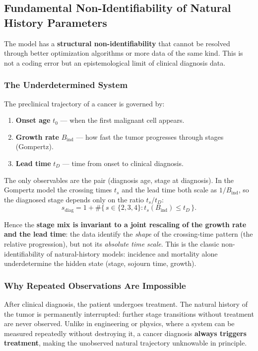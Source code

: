 \documentclass[12pt,a4paper]{article}
\begin{document}
\subsection{Fundamental Non-Identifiability of Natural History Parameters}
\label{sec:ident}

The model has a \textbf{structural non-identifiability} that cannot be resolved through better optimization algorithms or more data of the same kind. This is not a coding error but an epistemological limit of clinical diagnosis data.

\subsubsection{The Underdetermined System}

The preclinical trajectory of a cancer is governed by:
\begin{enumerate}[nosep]
    \item \textbf{Onset age} $t_0$ — when the first malignant cell appears.
    \item \textbf{Growth rate} $B_{\text{ind}}$ — how fast the tumor progresses through stages (Gompertz).
    \item \textbf{Lead time} $t_D$ — time from onset to clinical diagnosis.
\end{enumerate}

The only observables are the pair (diagnosis age, stage at diagnosis). In the Gompertz model the crossing times $t_s$ and the lead time both scale as $1/B_{\text{ind}}$, so the diagnosed stage depends only on the ratio $t_s / t_D$:
\begin{equation}
    s_{\text{diag}} = 1 + \#\{\, s \in \{2,3,4\} : t_s(B_{\text{ind}}) \le t_D \,\}.
\end{equation}

Hence the \textbf{stage mix is invariant to a joint rescaling of the growth rate and the lead time}: the data identify the \emph{shape} of the crossing-time pattern (the relative progression), but not its \emph{absolute time scale}. This is the classic non-identifiability of natural-history models: incidence and mortality alone underdetermine the hidden state (stage, sojourn time, growth).

\subsubsection{Why Repeated Observations Are Impossible}

After clinical diagnosis, the patient undergoes treatment. The natural history of the tumor is permanently interrupted: further stage transitions without treatment are never observed. Unlike in engineering or physics, where a system can be measured repeatedly without destroying it, a cancer diagnosis \textbf{always triggers treatment}, making the unobserved natural trajectory unknowable in principle.
\end{document}
